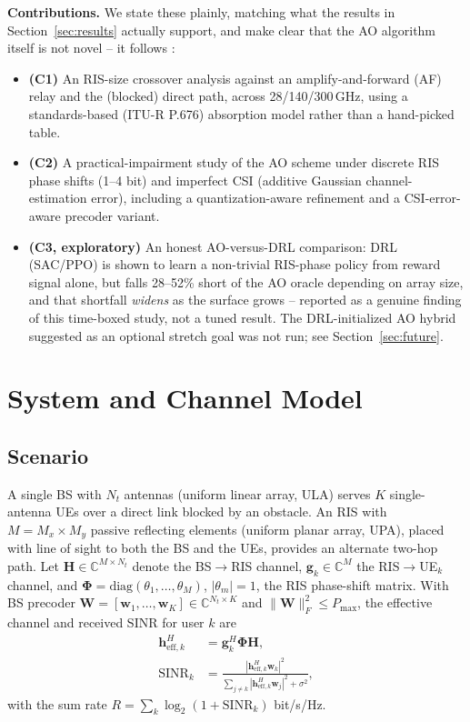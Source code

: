 \documentclass[conference]{IEEEtran}
\newcommand{\IRS}{RIS}
\begin{document}
\textbf{Contributions.} We state these plainly, matching what the
results in Section~\ref{sec:results} actually support, and make clear
that the AO algorithm itself is not novel -- it follows
\cite{wu2019intelligent,yu2019miso}:
\begin{itemize}
\item \textbf{(C1)} An \IRS{}-size crossover analysis against an
  amplify-and-forward (AF) relay and the (blocked) direct path, across
  28/140/300\,GHz, using a standards-based (ITU-R P.676) absorption
  model rather than a hand-picked table.
\item \textbf{(C2)} A practical-impairment study of the AO scheme under
  discrete \IRS{} phase shifts (1--4 bit) and imperfect CSI (additive
  Gaussian channel-estimation error), including a quantization-aware
  refinement and a CSI-error-aware precoder variant.
\item \textbf{(C3, exploratory)} An honest AO-versus-DRL comparison: DRL
  (SAC/PPO) is shown to learn a non-trivial \IRS{}-phase policy from
  reward signal alone, but falls 28--52\% short of the AO oracle
  depending on array size, and that shortfall \emph{widens} as the
  surface grows -- reported as a genuine finding of this time-boxed
  study, not a tuned result. The DRL-initialized AO hybrid suggested as
  an optional stretch goal was not run; see Section~\ref{sec:future}.
\end{itemize}

\section{System and Channel Model}
\label{sec:system}

\subsection{Scenario}
A single BS with $N_t$ antennas (uniform linear array, ULA) serves $K$
single-antenna UEs over a direct link blocked by an obstacle. An
\IRS{} with $M = M_x \times M_y$ passive reflecting elements (uniform
planar array, UPA), placed with line of sight to both the BS and the
UEs, provides an alternate two-hop path. Let $\mathbf{H}\in
\mathbb{C}^{M\times N_t}$ denote the BS$\to$\IRS{} channel,
$\mathbf{g}_k\in\mathbb{C}^{M}$ the \IRS{}$\to$UE$_k$ channel, and
$\mathbf{\Phi}=\mathrm{diag}(\theta_1,\dots,\theta_M)$, $|\theta_m|=1$,
the \IRS{} phase-shift matrix. With BS precoder
$\mathbf{W}=[\mathbf{w}_1,\dots,\mathbf{w}_K]\in\mathbb{C}^{N_t\times K}$
and $\|\mathbf{W}\|_F^2 \le P_{\max}$, the effective channel and
received SINR for user $k$ are
\begin{align}
\mathbf{h}_{\mathrm{eff},k}^H &= \mathbf{g}_k^H \mathbf{\Phi} \mathbf{H}, \label{eq:heff}\\
\mathrm{SINR}_k &= \frac{|\mathbf{h}_{\mathrm{eff},k}^H \mathbf{w}_k|^2}
                        {\sum_{j\neq k}|\mathbf{h}_{\mathrm{eff},k}^H \mathbf{w}_j|^2 + \sigma^2}, \label{eq:sinr}
\end{align}
with the sum rate $R=\sum_k \log_2(1+\mathrm{SINR}_k)$ bit/s/Hz.
\end{document}
